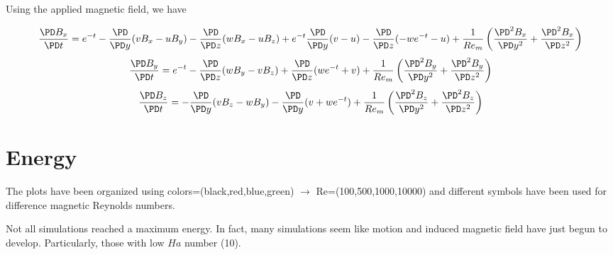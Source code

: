 \documentclass[11pt]{article}
\newcommand{\figS}{22.1em}
\newcommand{\figH}{\figS}
\newcommand{\figW}{\figS}
\begin{document}
Using the applied magnetic field, we have

\begin{equation}
	\frac{\PD B_x}{\PD t}
	=
	e^{-t}
	- \frac{\PD}{\PD y} (v B_x - u B_y)
	- \frac{\PD}{\PD z} (w B_x - u B_z)
	+ e^{-t} \frac{\PD}{\PD y} (v - u)
	- \frac{\PD}{\PD z} (-w e^{-t} - u)
	+
	\frac{1}{Re_m}
	\left(
	\frac{\PD^2 B_x}{\PD y^2}
	+ \frac{\PD^2 B_x}{\PD z^2}
	\right)
\end{equation}
\begin{equation}
	\frac{\PD B_y}{\PD t}
	=
	e^{-t}
	- \frac{\PD}{\PD z} (w B_y - v B_z)
	+ \frac{\PD}{\PD z} (w e^{-t} + v)
	+
	\frac{1}{Re_m}
	\left(
	\frac{\PD^2 B_y}{\PD y^2}
	+ \frac{\PD^2 B_y}{\PD z^2}
	\right)
\end{equation}
\begin{equation}
	\frac{\PD B_z}{\PD t}
	=
	- \frac{\PD}{\PD y} (v B_z - w B_y)
	- \frac{\PD}{\PD y} (v + w e^{-t})
	+
	\frac{1}{Re_m}
	\left(
	\frac{\PD^2 B_z}{\PD y^2}
	+ \frac{\PD^2 B_z}{\PD z^2}
	\right)
\end{equation}

\section{Energy}
The plots have been organized using colors=(black,red,blue,green) $\rightarrow$ Re=(100,500,1000,10000) and different symbols have been used for difference magnetic Reynolds numbers.

Not all simulations reached a maximum energy. In fact, many simulations seem like motion and induced magnetic field have just begun to develop. Particularly, those with low $Ha$ number (10).


\end{document}
